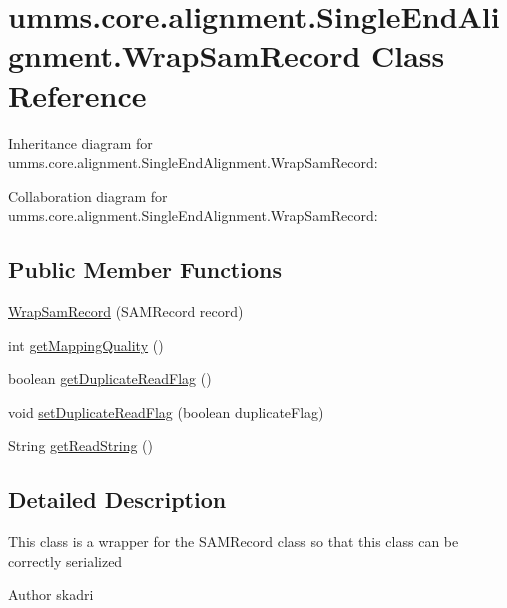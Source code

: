 \hypertarget{classumms_1_1core_1_1alignment_1_1_single_end_alignment_1_1_wrap_sam_record}{\section{umms.\+core.\+alignment.\+Single\+End\+Alignment.\+Wrap\+Sam\+Record Class Reference}
\label{classumms_1_1core_1_1alignment_1_1_single_end_alignment_1_1_wrap_sam_record}
}


Inheritance diagram for umms.\+core.\+alignment.\+Single\+End\+Alignment.\+Wrap\+Sam\+Record\+:


Collaboration diagram for umms.\+core.\+alignment.\+Single\+End\+Alignment.\+Wrap\+Sam\+Record\+:
\subsection*{Public Member Functions}
\begin{DoxyCompactItemize}
\item 
\hyperlink{classumms_1_1core_1_1alignment_1_1_single_end_alignment_1_1_wrap_sam_record_a56de26ffb9df6c9783051a0c8f2b8e02}{Wrap\+Sam\+Record} (S\+A\+M\+Record record)
\item 
int \hyperlink{classumms_1_1core_1_1alignment_1_1_single_end_alignment_1_1_wrap_sam_record_adf5f702667ceba749cf001eea76c57c3}{get\+Mapping\+Quality} ()
\item 
boolean \hyperlink{classumms_1_1core_1_1alignment_1_1_single_end_alignment_1_1_wrap_sam_record_a4c4da4b04c7efeca4b59e54d03a60d6c}{get\+Duplicate\+Read\+Flag} ()
\item 
void \hyperlink{classumms_1_1core_1_1alignment_1_1_single_end_alignment_1_1_wrap_sam_record_a3a5b72b49f62e442cc56ea8761e0e7b6}{set\+Duplicate\+Read\+Flag} (boolean duplicate\+Flag)
\item 
String \hyperlink{classumms_1_1core_1_1alignment_1_1_single_end_alignment_1_1_wrap_sam_record_a99563863c6d0389540ae3a48a415c675}{get\+Read\+String} ()
\end{DoxyCompactItemize}


\subsection{Detailed Description}
This class is a wrapper for the S\+A\+M\+Record class so that this class can be correctly serialized \begin{DoxyAuthor}{Author}
skadri 
\end{DoxyAuthor}



